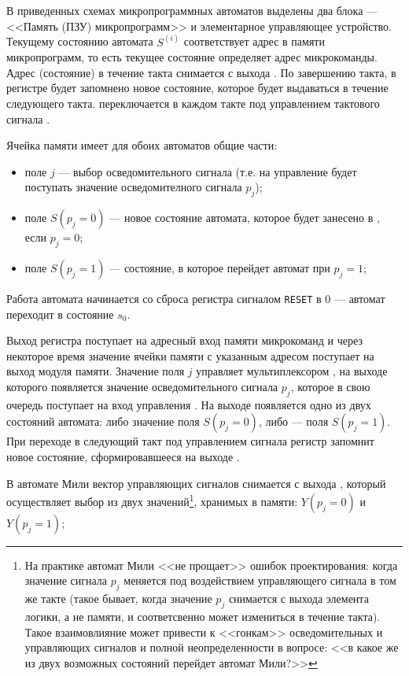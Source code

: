 В приведенных схемах микропрограммных автоматов выделены два блока --- <<Память (ПЗУ) микропрограмм>> и элементарное управляющее устройство. Текущему состоянию автомата $S^{(i)}$ соответствует адрес в памяти микропрограмм, то есть текущее состояние определяет адрес микрокоманды. Адрес (состояние) в течение такта снимается с выхода . По завершению такта, в регистре  будет запомнено новое состояние, которое будет выдаваться в течение следующего такта.  переключается в каждом такте под управлением тактового сигнала .

Ячейка памяти имеет для обоих автоматов общие части: 
\begin{itemize}
    \item поле $j$ --- выбор осведомительного сигнала (т.е. на управление  будет поступать значение осведомителного сигнала $p_j$);
    
    \item поле $S(p_j=0)$ --- новое состояние автомата, которое будет занесено в , если $p_j=0$;
    
    \item поле $S(p_j=1)$ --- состояние, в которое перейдет автомат при $p_j=1$;    
\end{itemize}

Работа автомата начинается со сброса регистра  сигналом \texttt{RESET} в 0 --- автомат переходит в состояние $s_0$. 

Выход регистра  поступает на адресный вход памяти микрокоманд и через некоторое время значение ячейки памяти с указанным адресом поступает на выход модуля памяти. Значение поля $j$ управляет мультиплексором , на выходе которого появляется значение осведомительного сигнала $p_j$, которое в свою очередь поступает на вход управления . На выходе  появляется одно из двух состояний автомата: либо значение поля $S(p_j=0)$, либо --- поля $S(p_j=1)$. При переходе в следующий такт под управлением сигнала  регистр  запомнит новое состояние, сформировавшееся на выходе .

В автомате Мили вектор управляющих сигналов снимается с выхода , который осуществляет выбор из двух значений\footnote{
    На практике автомат Мили <<не прощает>> ошибок проектирования: когда значение сигнала $p_j$ меняется под воздействием управляющего сигнала в том же такте (такое бывает, когда значение $p_j$ снимается с выхода элемента логики, а не памяти, и соответсвенно может измениться в течение такта). Такое взаимовлияние может привести к <<гонкам>> осведомительных и управляющих сигналов и полной неопределенности в вопросе: <<в какое же из двух возможных состояний перейдет автомат Мили?>>
}, хранимых в памяти: $Y(p_j=0)$ и $Y(p_j=1)$;

